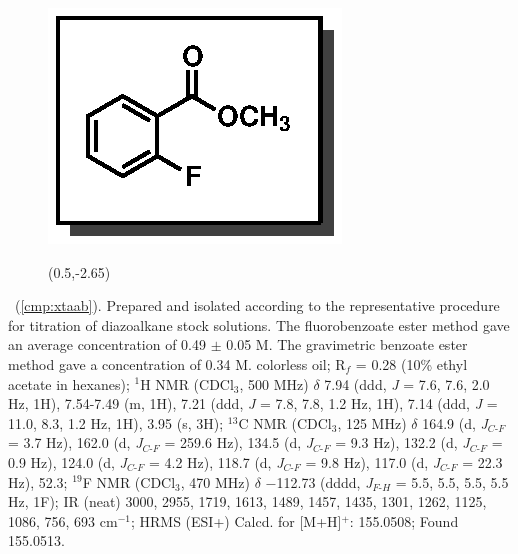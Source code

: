 \pagebreak
\begin{figure}
  \vspace{-20pt}
  \begin{center}
    \includegraphics[scale=0.8]{chp_asymmetric/images/xtaab}
      \begin{textblock}{1}(0.5,-2.65)  \end{textblock}
  \end{center}
  \vspace{-35pt}
\end{figure}\noindent \textbf{\CMPxtaab}\ (\ref{cmp:xtaab}). Prepared and
isolated according to the representative procedure for titration of diazoalkane
stock solutions. The fluorobenzoate ester method gave an average concentration
of 0.49 $\pm$ 0.05 M. The gravimetric benzoate ester method gave a concentration
of 0.34 M. colorless oil; R$_f$ = 0.28 (10\% ethyl acetate in hexanes); $^1$H
NMR (CDCl$_3$, 500 MHz) $\delta$ 7.94 (ddd, \textit{J} = 7.6, 7.6, 2.0 Hz, 1H),
7.54-7.49 (m, 1H), 7.21 (ddd, \textit{J} = 7.8, 7.8, 1.2 Hz, 1H), 7.14 (ddd,
\textit{J} = 11.0, 8.3, 1.2 Hz, 1H), 3.95 (s, 3H); $^{13}$C NMR (CDCl$_3$, 125
MHz) $\delta$ 164.9 (d, \textit{J}$_{C\mbox{-}F}$ = 3.7 Hz), 162.0 (d,
\textit{J}$_{C\mbox{-}F}$ = 259.6 Hz), 134.5 (d, \textit{J}$_{C\mbox{-}F}$ = 9.3
Hz), 132.2 (d, \textit{J}$_{C\mbox{-}F}$ = 0.9 Hz), 124.0 (d,
\textit{J}$_{C\mbox{-}F}$ = 4.2 Hz), 118.7 (d, \textit{J}$_{C\mbox{-}F}$ = 9.8
Hz), 117.0 (d, \textit{J}$_{C\mbox{-}F}$ = 22.3 Hz), 52.3; $^{19}$F NMR
(CDCl$_3$, 470 MHz) $\delta$ $-$112.73 (dddd, \textit{J}$_{F\mbox{-}H}$ = 5.5,
5.5, 5.5, 5.5 Hz, 1F); IR (neat) 3000, 2955, 1719, 1613, 1489, 1457, 1435, 1301,
1262, 1125, 1086, 756, 693 cm$^{-1}$; HRMS (ESI+) Calcd. for 
[M+H]$^+$: 155.0508; Found 155.0513.

